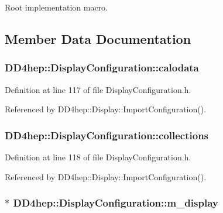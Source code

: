 Root implementation macro. 

\subsection{Member Data Documentation}
\hypertarget{class_d_d4hep_1_1_display_configuration_a8ff4fbadd2821a8dbbc0f5006f60357f}{
\subsubsection[{calodata}]{ {\bf DD4hep::DisplayConfiguration::calodata}}}
\label{class_d_d4hep_1_1_display_configuration_a8ff4fbadd2821a8dbbc0f5006f60357f}


Definition at line 117 of file DisplayConfiguration.h.

Referenced by DD4hep::Display::ImportConfiguration().\hypertarget{class_d_d4hep_1_1_display_configuration_af92e64fe8730543b07e698279dd23f7a}{
\subsubsection[{collections}]{ {\bf DD4hep::DisplayConfiguration::collections}}}
\label{class_d_d4hep_1_1_display_configuration_af92e64fe8730543b07e698279dd23f7a}


Definition at line 118 of file DisplayConfiguration.h.

Referenced by DD4hep::Display::ImportConfiguration().\hypertarget{class_d_d4hep_1_1_display_configuration_aafc55c829834377c847861133f87637a}{
\subsubsection[{m\_\-display}]{$\ast$ {\bf DD4hep::DisplayConfiguration::m\_\-display}}}
\label{class_d_d4hep_1_1_display_configuration_aafc55c829834377c847861133f87637a}


